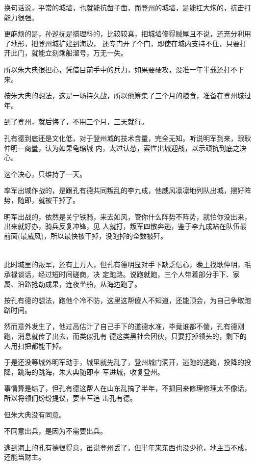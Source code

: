 \documentclass[11pt,a4paper,onecolumn]{article}
\begin{document}
换句话说，平常的城墙，也就能抗凿子凿，而登州的城墙，是能扛大炮的，抗击打能力很强。

更麻烦的是，孙巡抚是搞理科的，比较较真，把城墙修得贼厚且不说，还充分利用了地形，把登州城扩建到海边，
还专门开了个门，即使在城内支持不住，只要打开此门，就能立刻乘船溜号，万无一失。

所以朱大典很担心，凭借目前手中的兵力，如果要硬攻，没准一年半载还打不下来。

按朱大典的想法，这是一场持久战，所以他筹集了三个月的粮食，准备在登州城过年。

到了登州，就后悔了，不用三个月，三天就行。

孔有德到底还是文化低，对于登州城的技术含量，完全无知。听说明军到来，跟耿仲明一商量，认为如果龟缩城
内，太过认怂，索性出城迎战，以示顽抗到底之决心。

这个决心，只维持了一天。

率军出城作战的，是跟孔有德共同叛乱的李九成，他威风凛凛地列队出城，摆好阵势，随即，就被干掉了。

明军出战的，依然是关宁铁骑，来去如风，管你什么阵势不阵势，就怕你没出来，出来就好办，骑兵反复冲锋，见
人就打，叛军四散奔逃，鉴于李九成站在队伍最前面(最威风)，所以最快被干掉，没跑掉的全数被歼。

\section[\thesection]{}

此时城里的叛军，还有上万人，但孔有德明显对手下缺乏信心，晚上找耿仲明，毛承禄谈话，经过短时间磋商，决
定跑路。说跑就跑，三个人带着部分手下、家属、沿路抢劫成果，连夜坐船，从海边跑了。

按孔有德的想法，跑他个冷不防，这里这帮傻人不知道，还能顶会，为自己争取跑路时间。

然而意外发生了，他过高估计了自己手下的道德水准，毕竟谁都不傻，孔有德刚跑，消息就传了出去，而类似孔有
德这类黑社会团伙，只要打掉领头的，剩下的人用扫把都能干掉。

于是还没等城外明军动手，城里就先乱了，登州城门洞开，逃跑的逃跑，投降的投降，跳海的跳海，朱大典随即率
军进城，收复登州。

事情算是结了，但孔有德这帮人在山东乱搞了半年，不抓回来修理修理太不像话，所以将领们纷纷提议，要率军追
击孔有德。

但朱大典没有同意。

不同意出兵，是因为不需要出兵。

逃到海上的孔有德很得意，虽说登州丢了，但半年来东西也没少抢，地主当不成，还能当财主。
\end{document}
